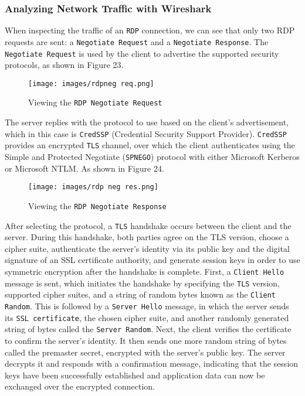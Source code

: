 \documentclass[a4paper]{article}
\newcommand{\abc}{\hfill \break}
\begin{document}
\subsubsection{Analyzing Network Traffic with Wireshark}
When inspecting the traffic of an \texttt{RDP} connection, we can see that only two RDP requests are sent: a \texttt{Negotiate Request} and a \texttt{Negotiate Response}. The \texttt{Negotiate Request} is used by the client to advertise the supported security protocols, as shown in Figure 23. \cite{rdp-negotiation-request}
\begin{figure}[h]
	\texttt{[image: images/rdpneg req.png]}
	\centering
	\caption{Viewing the \texttt{RDP Negotiate Request}}
\end{figure}\abc
The server replies with the protocol to use based on the client’s advertisement, which in this case is \texttt{CredSSP} (Credential Security Support Provider). \texttt{CredSSP} provides an encrypted \texttt{TLS} channel, over which the client authenticates using the Simple and Protected Negotiate (\texttt{SPNEGO}) protocol with either Microsoft Kerberos or Microsoft NTLM. As shown in Figure 24. \cite{alvinashcraft_credential_2021}
\begin{figure}[h]
	\texttt{[image: images/rdp neg res.png]}
	\centering
	\caption{Viewing the \texttt{RDP Negotiate Response}}
\end{figure}\abc \newpage \abc
After selecting the protocol, a \texttt{TLS} handshake occurs between the client and the server. During this handshake, both parties agree on the TLS version, choose a cipher suite, authenticate the server’s identity via its public key and the digital signature of an SSL certificate authority, and generate session keys in order to use symmetric encryption after the handshake is complete. \abc
First, a \texttt{Client Hello} message is sent, which initiates the handshake by specifying the \texttt{TLS} version, supported cipher suites, and a string of random bytes known as the \texttt{Client Random}. \abc
This is followed by a \texttt{Server Hello} message, in which the server sends its \texttt{SSL certificate}, the chosen cipher suite, and another randomly generated string of bytes called the \texttt{Server Random}. \abc
Next, the client verifies the certificate to confirm the server’s identity. It then sends one more random string of bytes called the premaster secret, encrypted with the server’s public key. The server decrypts it and responds with a confirmation message, indicating that the session keys have been successfully established and application data can now be exchanged over the encrypted connection. \abc
\end{document}
